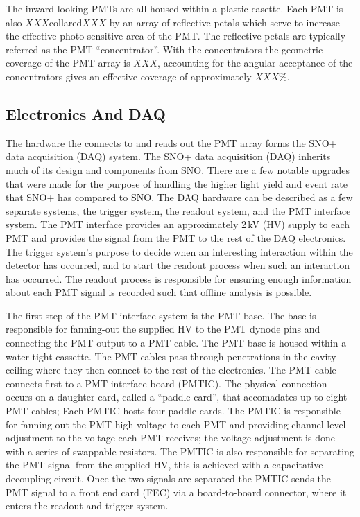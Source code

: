 The inward looking PMTs are all housed within a plastic casette.
Each PMT is also $XXX$collared$XXX$ by an array of reflective
petals which serve to increase the effective photo-sensitive area
of the PMT.
The reflective petals are typically referred as the PMT ``concentrator''.
With the concentrators the geometric coverage of the PMT array is $XXX$,
accounting for the angular acceptance of the concentrators gives
an effective coverage of approximately $XXX\%$.


\subsection{Electronics And DAQ}
The hardware the connects to and reads out the PMT array forms the SNO+ data acquisition (DAQ)
system\@.
The SNO+ data acquisition (DAQ) inherits much of its design and components from
SNO\@.
There are a few notable upgrades that were made for the purpose of handling the
higher light yield and event rate that SNO+ has compared to SNO\@.
The DAQ hardware can be described as a few separate systems, the trigger system,
the readout system, and the PMT interface system.
The PMT interface provides an approximately 2\,kV (HV) supply to each PMT and provides
the signal from the PMT to the rest of the DAQ electronics.
The trigger system's purpose to decide when an interesting interaction
within the detector has occurred, and to start the readout process when such an
interaction has occurred.
The readout process is responsible for ensuring enough information about each
PMT signal is recorded such that offline analysis is possible.

The first step of the PMT interface system is the PMT base. The base is responsible
for fanning-out the supplied HV to the PMT dynode pins and connecting the PMT output
to a PMT cable. The PMT base is housed within a water-tight cassette.
The PMT cables pass through penetrations in the cavity ceiling where they then connect
to the rest of the electronics. The PMT cable connects first to a PMT interface
board (PMTIC). The physical connection occurs on a daughter card, called a ``paddle card'',
that accomadates up to eight PMT cables; Each PMTIC hosts four paddle cards.
The PMTIC is responsible for fanning out the PMT high voltage
to each PMT and providing channel level adjustment to the voltage
each PMT receives; the voltage adjustment is done with a series of
swappable resistors.
The PMTIC is also responsible for separating the PMT signal from the supplied
HV, this is achieved with a capacitative decoupling circuit.
Once the two signals are separated the PMTIC sends the PMT signal to
a front end card (FEC) via a board-to-board connector, where it enters
the readout and trigger system.

